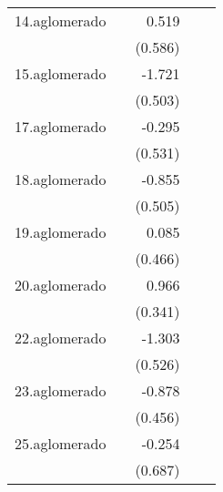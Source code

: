 {\begin{longtable}{l*{4}{D{.}{.}{-1}}}
\addlinespace
14.aglomerado&                     &       0.519         &                     &                     \\
            &                     &     (0.586)         &                     &                     \\
\addlinespace
15.aglomerado&                     &      -1.721\sym{***}&                     &                     \\
            &                     &     (0.503)         &                     &                     \\
\addlinespace
17.aglomerado&                     &      -0.295         &                     &                     \\
            &                     &     (0.531)         &                     &                     \\
\addlinespace
18.aglomerado&                     &      -0.855         &                     &                     \\
            &                     &     (0.505)         &                     &                     \\
\addlinespace
19.aglomerado&                     &       0.085         &                     &                     \\
            &                     &     (0.466)         &                     &                     \\
\addlinespace
20.aglomerado&                     &       0.966\sym{**} &                     &                     \\
            &                     &     (0.341)         &                     &                     \\
\addlinespace
22.aglomerado&                     &      -1.303\sym{*}  &                     &                     \\
            &                     &     (0.526)         &                     &                     \\
\addlinespace
23.aglomerado&                     &      -0.878         &                     &                     \\
            &                     &     (0.456)         &                     &                     \\
\addlinespace
25.aglomerado&                     &      -0.254         &                     &                     \\
            &                     &     (0.687)         &                     &                     \\

\end{longtable}}
